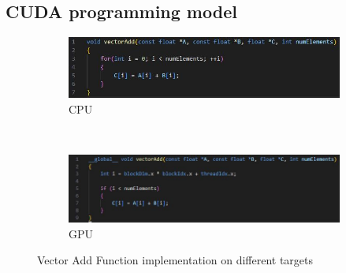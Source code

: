 \documentclass{article}
\begin{document}
\subsection{CUDA programming model}

\begin{figure}[t!]
  \begin{subfigure}[b]{0.75\textwidth}
    \includegraphics[width=12cm]{vector_add_c.JPG}
    \caption{CPU} \label{fig:vector_add_c}
  \end{subfigure}%
  \\
  \begin{subfigure}[b]{0.75\textwidth}
    \includegraphics[width=12cm]{vector_add_cu.JPG}
    \caption{GPU} \label{fig:vector_add_cu}
  \end{subfigure}%
  

\caption{Vector Add Function implementation on different targets} \label{fig:1}
\end{figure}
\end{document}
